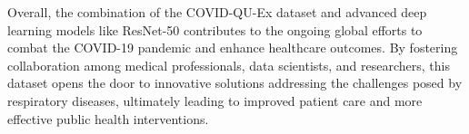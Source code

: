 \documentclass{article}
\begin{document}
Overall, the combination of the COVID-QU-Ex dataset and advanced deep learning models like ResNet-50 contributes to the ongoing global efforts to combat the COVID-19 pandemic and enhance healthcare outcomes. By fostering collaboration among medical professionals, data scientists, and researchers, this dataset opens the door to innovative solutions addressing the challenges posed by respiratory diseases, ultimately leading to improved patient care and more effective public health interventions.
\end{document}
